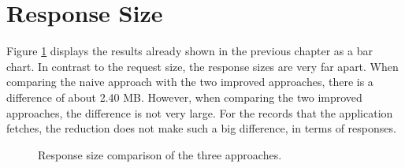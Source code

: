 \section{Response Size}

Figure \ref{fig:discussion:response-size} displays the results already shown in the previous chapter as a bar chart. In contrast to the request size, the response sizes are very far apart. When comparing the naive approach with the two improved approaches, there is a difference of about 2.40 MB. However, when comparing the two improved approaches, the difference is not very large. For the records that the application fetches, the reduction does not make such a big difference, in terms of responses. 

\begin{figure}[H]
  \centering
  \caption{Response size comparison of the three approaches.}\label{fig:discussion:response-size}
\end{figure}
